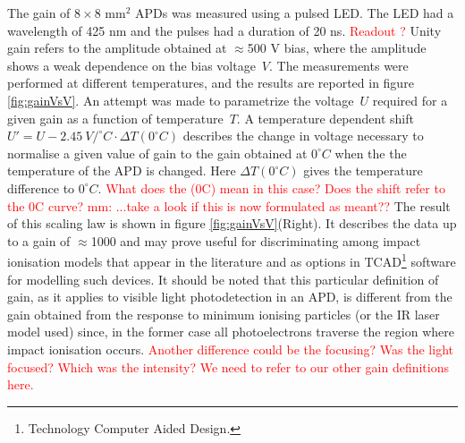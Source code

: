 \documentclass{article}
\begin{document}
The gain of $8 \times 8$ mm$^2$ APDs was measured using a pulsed LED.
The LED had a wavelength of 425 nm and the pulses had a duration of 20 ns.
\textcolor{red}{Readout ?}
Unity gain refers to the amplitude obtained at $\approx$500 V bias, where the amplitude shows a weak dependence on the bias voltage~$V$.
The measurements were performed at different temperatures, and the results are reported in figure\,\ref{fig:gainVsV}.
An attempt was made to parametrize
the  voltage~$U$ required for a given gain as a function of temperature~$T$.
A temperature dependent shift $U' = U -2.45~ V/^\circ C \cdot \Delta T( 0^\circ C)$ describes the change in voltage necessary to normalise a given value of gain to the gain obtained at $0^\circ C$ when the the temperature of the APD is changed. Here $\Delta T( 0^\circ C)$ gives the temperature difference to $0^\circ C$. 
\textcolor{red}{What does the (0C) mean in this case? Does the shift refer to the 0C curve?
mm: ...take a look if this is now formulated as meant??} The result of this scaling law is shown in figure \ref{fig:gainVsV}(Right).
It describes the data up to a gain of
$\approx$1000 and may prove useful for discriminating among impact ionisation models that appear in the literature and as options in TCAD\footnote{Technology Computer Aided Design.} software for modelling such devices.
It should be noted that this particular definition of gain, as it applies to visible light photodetection in an APD, 
is different from the gain obtained from the response to minimum ionising particles (or the IR laser model used) since, in the former case all photoelectrons traverse the region where impact ionisation occurs.
\textcolor{red}{Another difference could be the focusing? Was the light focused? Which was the intensity?}
\textcolor{red}{We need to refer to our other gain definitions here.}
\end{document}
